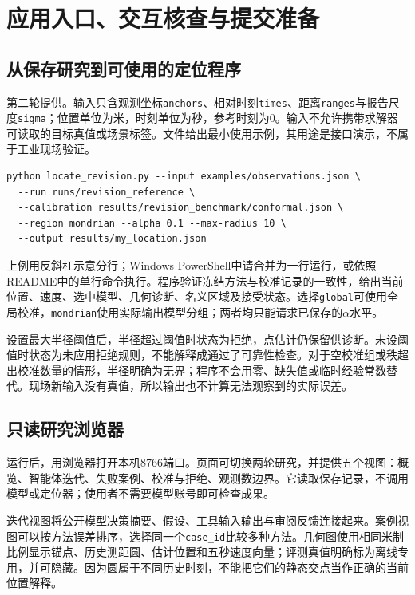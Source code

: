 \section{应用入口、交互核查与提交准备}
\label{app:usability}

\subsection{从保存研究到可使用的定位程序}
第二轮提供。输入只含观测坐标\texttt{anchors}、相对时刻\texttt{times}、距离\texttt{ranges}与报告尺度\texttt{sigma}；位置单位为米，时刻单位为秒，参考时刻为0。输入不允许携带求解器可读取的目标真值或场景标签。文件给出最小使用示例，其用途是接口演示，不属于工业现场验证。

\begin{lstlisting}
python locate_revision.py --input examples/observations.json \
  --run runs/revision_reference \
  --calibration results/revision_benchmark/conformal.json \
  --region mondrian --alpha 0.1 --max-radius 10 \
  --output results/my_location.json
\end{lstlisting}
上例用反斜杠示意分行；Windows PowerShell中请合并为一行运行，或依照README中的单行命令执行。程序验证冻结方法与校准记录的一致性，给出当前位置、速度、选中模型、几何诊断、名义区域及接受状态。选择\texttt{global}可使用全局校准，\texttt{mondrian}使用实际输出模型分组；两者均只能请求已保存的$\alpha$水平。

设置最大半径阈值后，半径超过阈值时状态为拒绝，点估计仍保留供诊断。未设阈值时状态为未应用拒绝规则，不能解释成通过了可靠性检查。对于空校准组或秩超出校准数量的情形，半径明确为无界；程序不会用零、缺失值或临时经验常数替代。现场新输入没有真值，所以输出也不计算无法观察到的实际误差。

\subsection{只读研究浏览器}
运行后，用浏览器打开本机8766端口。页面可切换两轮研究，并提供五个视图：概览、智能体迭代、失败案例、校准与拒绝、观测数边界。它读取保存记录，不调用模型或定位器；使用者不需要模型账号即可检查成果。

迭代视图将公开模型决策摘要、假设、工具输入输出与审阅反馈连接起来。案例视图可以按方法误差排序，选择同一个\texttt{case\_id}比较多种方法。几何图使用相同米制比例显示锚点、历史测距圆、估计位置和五秒速度向量；评测真值明确标为离线专用，并可隐藏。因为圆属于不同历史时刻，不能把它们的静态交点当作正确的当前位置解释。

